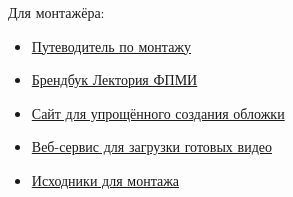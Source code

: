 Для монтажёра:
\begin{itemize}[topsep=1.5\parskip, itemsep=0.5\parskip]

  \item \hypertarget{montage-guide}{\href{https://docs.google.com/document/d/1C0CD0fsVVS9BenCpTreZ5FcqkIHK0CbTvGP9FLZNw_U}{Путеводитель по монтажу}}

  \item \hypertarget{brandbook}{\href{https://docs.google.com/document/d/1gvvcnXO6g95U7eQbLfTDaoMDVi-qoh5e1l4vvGuZ1mg}{Брендбук Лектория ФПМИ}}

  \item \hypertarget{cover-creation-site}{\href{https://lectory.stfpmi.ru/previews/}{Сайт для упрощённого создания обложки}}
  
  \item \hypertarget{web-interface}{\href{https://lectory.stfpmi.ru/}{Веб-сервис для загрузки готовых видео}}

  \item \hypertarget{video-sources}{\href{https://drive.stfpmi.ru/apps/files/?dir=/Лекторий ФПМИ/Исходники для монтажа&fileid=55602}{Исходники для монтажа}}
\end{itemize}
